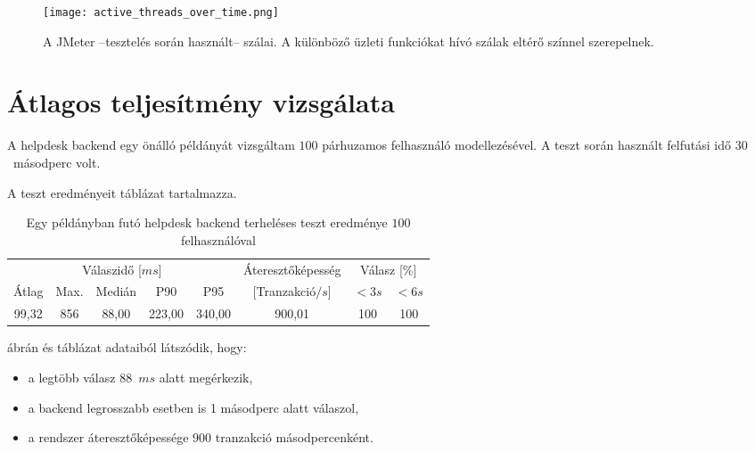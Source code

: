 \begin{figure}[hbt] 
	\centering
	\texttt{[image: active\_threads\_over\_time.png]}
	\caption[A JMeter tesztelés során használt-- szálai]{A JMeter --tesztelés során használt-- szálai. A különböző üzleti funkciókat hívó szálak eltérő színnel szerepelnek.}
	\label{fig:active_threads_over_time}
\end{figure}



\section{Átlagos teljesítmény vizsgálata}
A helpdesk backend egy önálló példányát vizsgáltam $100$ párhuzamos felhasználó modellezésével. A teszt során használt felfutási idő $30$~másodperc volt.

A teszt eredményeit  táblázat tartalmazza.

\begin{table}[hbt]
	
	\begin{tabular}{ccccc|c|cc}
		\multicolumn{5}{c|}{Válaszidő [$ms$]}  & Áteresztőképesség & \multicolumn{2}{c}{Válasz [\%]}	\\
		Átlag & Max. & Medián & P90 & P95 &	[Tranzakció$/s$] & $<3s$& $<6s$ \\
		\hline 
		99,32 & 856 & 88,00 & 223,00 & 340,00 & 900,01 & 100 & 100 \\
	\end{tabular} 
	
	\caption{Egy példányban futó helpdesk backend terheléses teszt eredménye $100$ felhasználóval}
	\label{tabl:1_instance_100_user}
\end{table}

 ábrán és  táblázat adataiból látszódik, hogy:
\begin{itemize}
	\item a legtöbb válasz 88~$ms$ alatt megérkezik,
	\item a backend legrosszabb esetben is 1 másodperc alatt válaszol,
	\item a rendszer áteresztőképessége 900 tranzakció másodpercenként.
\end{itemize}


